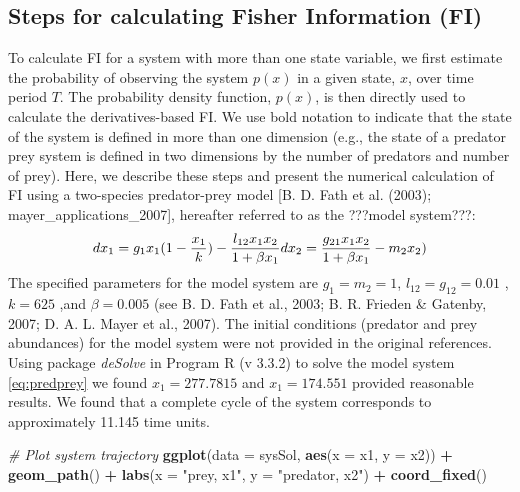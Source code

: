 \documentclass[12pt,twoside,openany]{reedthesis}
\newenvironment{Shaded}{\begin{snugshade}}{\end{snugshade}}
\newcommand{\KeywordTok}[1]{\textcolor[rgb]{0.13,0.29,0.53}{\textbf{#1}}}
\newcommand{\DataTypeTok}[1]{\textcolor[rgb]{0.13,0.29,0.53}{#1}}
\newcommand{\StringTok}[1]{\textcolor[rgb]{0.31,0.60,0.02}{#1}}
\newcommand{\CommentTok}[1]{\textcolor[rgb]{0.56,0.35,0.01}{\textit{#1}}}
\newcommand{\OperatorTok}[1]{\textcolor[rgb]{0.81,0.36,0.00}{\textbf{#1}}}
\newcommand{\NormalTok}[1]{#1}
\begin{document}
\subsection{Steps for calculating Fisher Information
(FI)}\label{steps-for-calculating-fisher-information-fi}

To calculate FI for a system with more than one state variable, we first
estimate the probability of observing the system \(p(x)\) in a given
state, \(x\), over time period \(T\). The probability density function,
\(p(x)\), is then directly used to calculate the derivatives-based FI.
We use bold notation to indicate that the state of the system is defined
in more than one dimension (e.g., the state of a predator prey system is
defined in two dimensions by the number of predators and number of
prey). Here, we describe these steps and present the numerical
calculation of FI using a two-species predator-prey model {[}B. D. Fath
et al. (2003); mayer\_applications\_2007{]}, hereafter referred to as
the ???model system???:
\begin{equation} 
  dx_1 = g_{1}x_{1}(1-\frac{x_1}{k})- \frac{l_{12} x_{1} x_{2}}{1+\beta x_{1}} \\
  dx_2 = \frac{g_{21}x_1 x_2}{1+\beta x_1} - m_2 x_2) \\
  \label{eq:predprey}
\end{equation}
The specified parameters for the model system are \(g_1=m_2=1\),
\(l_12=g_12 = 0.01\) , \(k=625\) ,and \(\beta=0.005\) (see B. D. Fath et
al., 2003; B. R. Frieden \& Gatenby, 2007; D. A. L. Mayer et al., 2007).
The initial conditions (predator and prey abundances) for the model
system were not provided in the original references. Using package
\emph{deSolve} in Program R (v 3.3.2) to solve the model system
\eqref{eq:predprey} we found \(x_1 = 277.7815\) and \(x_1= 174.551\)
provided reasonable results. We found that a complete cycle of the
system corresponds to approximately 11.145 time units.
\begin{Shaded}
\begin{Highlighting}[]
\CommentTok{# Plot system trajectory}
\KeywordTok{ggplot}\NormalTok{(}\DataTypeTok{data =}\NormalTok{ sysSol, }\KeywordTok{aes}\NormalTok{(}\DataTypeTok{x =}\NormalTok{ x1, }\DataTypeTok{y =}\NormalTok{ x2)) }\OperatorTok{+}
\StringTok{  }\KeywordTok{geom_path}\NormalTok{() }\OperatorTok{+}
\StringTok{  }\KeywordTok{labs}\NormalTok{(}\DataTypeTok{x =} \StringTok{"prey, x1"}\NormalTok{, }\DataTypeTok{y =} \StringTok{"predator, x2"}\NormalTok{) }\OperatorTok{+}
\StringTok{  }\KeywordTok{coord_fixed}\NormalTok{()}
\end{Highlighting}
\end{Shaded}
\end{document}

